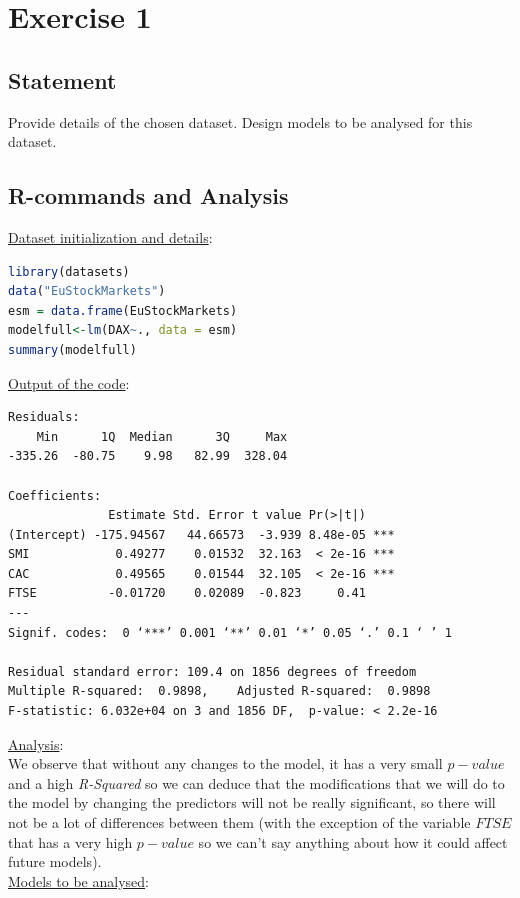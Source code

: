 \documentclass[a4paper, 11pt]{article}
\begin{document}
\newpage
\section{Exercise 1}
\subsection{Statement}
Provide details of the chosen dataset. Design models to be analysed for this dataset.
\subsection{R-commands and Analysis}

\underline{Dataset initialization and details}:
\begin{lstlisting}[language=R]
library(datasets)
data("EuStockMarkets")
esm = data.frame(EuStockMarkets)
modelfull<-lm(DAX~., data = esm)
summary(modelfull)
\end{lstlisting}
\vspace{1em}
\underline{Output of the code}:\label{pocotexto}
\small\begin{verbatim}
Residuals:
    Min      1Q  Median      3Q     Max 
-335.26  -80.75    9.98   82.99  328.04 

Coefficients:
              Estimate Std. Error t value Pr(>|t|)    
(Intercept) -175.94567   44.66573  -3.939 8.48e-05 ***
SMI            0.49277    0.01532  32.163  < 2e-16 ***
CAC            0.49565    0.01544  32.105  < 2e-16 ***
FTSE          -0.01720    0.02089  -0.823     0.41    
---
Signif. codes:  0 ‘***’ 0.001 ‘**’ 0.01 ‘*’ 0.05 ‘.’ 0.1 ‘ ’ 1

Residual standard error: 109.4 on 1856 degrees of freedom
Multiple R-squared:  0.9898,	Adjusted R-squared:  0.9898 
F-statistic: 6.032e+04 on 3 and 1856 DF,  p-value: < 2.2e-16
\end{verbatim}\label{hawai}
\vspace{1em}
\underline{Analysis}:\\
We observe that without any changes to the model, it has a very small $p-value$ and a high\textit{ R-Squared} so we can deduce that the modifications that we will do to the model by changing the predictors will not be really significant, so there will not be a lot of differences between them (with the exception of the variable $FTSE$ that has a very high $p-value$ so we can't say anything about how it could affect future models). \\
\newpage
\hspace{-1.5em}\underline{Models to be analysed}:
\end{document}
